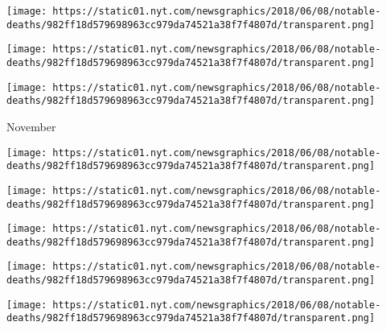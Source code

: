 \href{https://www.nytimes.com/2018/12/04/obituaries/philip-bosco-dead.html}{}

\texttt{[image: https://static01.nyt.com/newsgraphics/2018/06/08/notable-deaths/982ff18d579698963cc979da74521a38f7f4807d/transparent.png]}

\href{https://www.nytimes.com/2018/12/04/obituaries/paul-gregory-dead.html}{}

\texttt{[image: https://static01.nyt.com/newsgraphics/2018/06/08/notable-deaths/982ff18d579698963cc979da74521a38f7f4807d/transparent.png]}

\href{https://www.nytimes.com/2018/12/02/obituaries/ken-berry-dies-at-85.html}{}

\texttt{[image: https://static01.nyt.com/newsgraphics/2018/06/08/notable-deaths/982ff18d579698963cc979da74521a38f7f4807d/transparent.png]}

November

\href{https://www.nytimes.com/2018/11/30/us/politics/george-hw-bush-dies.html}{}

\texttt{[image: https://static01.nyt.com/newsgraphics/2018/06/08/notable-deaths/982ff18d579698963cc979da74521a38f7f4807d/transparent.png]}

\href{https://www.nytimes.com/2018/11/30/obituaries/gloria-katz-dead.html}{}

\texttt{[image: https://static01.nyt.com/newsgraphics/2018/06/08/notable-deaths/982ff18d579698963cc979da74521a38f7f4807d/transparent.png]}

\href{https://www.nytimes.com/2018/11/29/obituaries/robert-morris-dead.html}{}

\texttt{[image: https://static01.nyt.com/newsgraphics/2018/06/08/notable-deaths/982ff18d579698963cc979da74521a38f7f4807d/transparent.png]}

\href{https://www.nytimes.com/2018/11/29/obituaries/patricia-quintana-dead.html}{}

\texttt{[image: https://static01.nyt.com/newsgraphics/2018/06/08/notable-deaths/982ff18d579698963cc979da74521a38f7f4807d/transparent.png]}

\href{https://www.nytimes.com/2018/11/27/obituaries/harold-levy-dead.html}{}

\texttt{[image: https://static01.nyt.com/newsgraphics/2018/06/08/notable-deaths/982ff18d579698963cc979da74521a38f7f4807d/transparent.png]}

\href{https://www.nytimes.com/2018/11/27/obituaries/stephen-hillenburg-spongebob-squarepants-creator-dies-at-57.htm}{}

